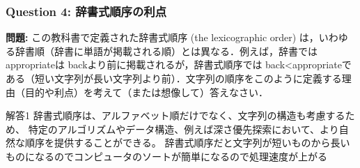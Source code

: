 \begin{frame}
  \frametitle{Question 4: 辞書式順序の利点}
  \textbf{問題:} この教科書で定義された辞書式順序 (the lexicographic order) は，いわゆる辞書順（辞書に単語が掲載される順）とは異なる．例えば，辞書では appropriateは backより前に掲載されるが，辞書式順序では back<appropriateである（短い文字列が長い文字列より前）．文字列の順序をこのように定義する理由（目的や利点）を考えて（または想像して）答えなさい．
  \vspace{0.3em}

  \begin{alertblock}{解答1}
      辞書式順序は、アルファベット順だけでなく、文字列の構造も考慮するため、
      特定のアルゴリズムやデータ構造、例えば深さ優先探索において、より自然な順序を提供することができる。
      辞書式順序だと文字列が短いものから長いものになるのでコンピュータのソートが簡単になるので処理速度が上がる
  \end{alertblock}
\end{frame}